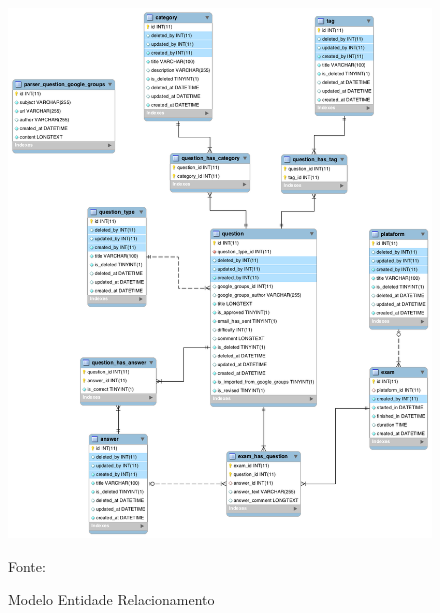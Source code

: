 \begin{figure}[h!tb]
	\caption{Modelo Entidade Relacionamento}
	\label{fig:modeloEntidadeRelacionamento}

	\centering
	\includegraphics[width=\textwidth]{images/zcpe-reverse-engineer-database.png}

	\centering
	\footnotesize Fonte: \fonteOAutor
\end{figure}

\FloatBarrier 	%



